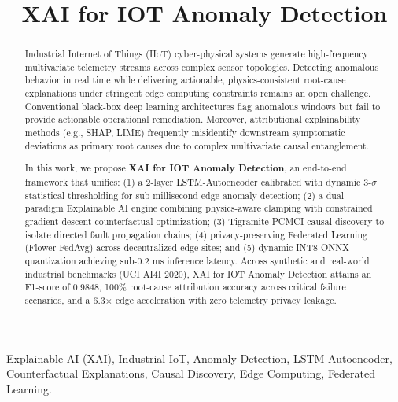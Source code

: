 \documentclass[conference]{IEEEtran}
\begin{document}
\title{XAI for IOT Anomaly Detection}

\author{
}

\maketitle

\begin{abstract}
Industrial Internet of Things (IIoT) cyber-physical systems generate high-frequency multivariate telemetry streams across complex sensor topologies. Detecting anomalous behavior in real time while delivering actionable, physics-consistent root-cause explanations under stringent edge computing constraints remains an open challenge. Conventional black-box deep learning architectures flag anomalous windows but fail to provide actionable operational remediation. Moreover, attributional explainability methods (e.g., SHAP, LIME) frequently misidentify downstream symptomatic deviations as primary root causes due to complex multivariate causal entanglement. 

In this work, we propose \textbf{XAI for IOT Anomaly Detection}, an end-to-end framework that unifies: (1) a 2-layer LSTM-Autoencoder calibrated with dynamic 3-$\sigma$ statistical thresholding for sub-millisecond edge anomaly detection; (2) a dual-paradigm Explainable AI engine combining physics-aware clamping with constrained gradient-descent counterfactual optimization; (3) Tigramite PCMCI causal discovery to isolate directed fault propagation chains; (4) privacy-preserving Federated Learning (Flower FedAvg) across decentralized edge sites; and (5) dynamic INT8 ONNX quantization achieving sub-0.2 ms inference latency. Across synthetic and real-world industrial benchmarks (UCI AI4I 2020), XAI for IOT Anomaly Detection attains an F1-score of 0.9848, 100\% root-cause attribution accuracy across critical failure scenarios, and a 6.3$\times$ edge acceleration with zero telemetry privacy leakage.
\end{abstract}

\begin{IEEEkeywords}
Explainable AI (XAI), Industrial IoT, Anomaly Detection, LSTM Autoencoder, Counterfactual Explanations, Causal Discovery, Edge Computing, Federated Learning.
\end{IEEEkeywords}
\end{document}
